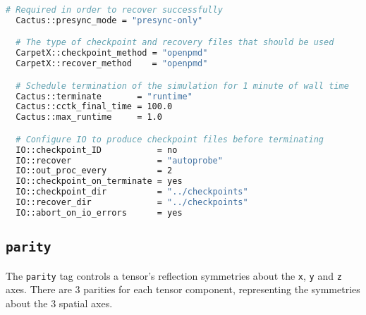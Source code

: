 \begin{lstlisting}[language=bash]
  # Required in order to recover successfully
  Cactus::presync_mode = "presync-only"

  # The type of checkpoint and recovery files that should be used
  CarpetX::checkpoint_method = "openpmd"
  CarpetX::recover_method    = "openpmd"

  # Schedule termination of the simulation for 1 minute of wall time
  Cactus::terminate       = "runtime"
  Cactus::cctk_final_time = 100.0
  Cactus::max_runtime     = 1.0

  # Configure IO to produce checkpoint files before terminating
  IO::checkpoint_ID           = no
  IO::recover                 = "autoprobe"
  IO::out_proc_every          = 2
  IO::checkpoint_on_terminate = yes
  IO::checkpoint_dir          = "../checkpoints"
  IO::recover_dir             = "../checkpoints"
  IO::abort_on_io_errors      = yes
\end{lstlisting}

\subsection{\texttt{parity}}
The \texttt{parity} tag controls a tensor's reflection symmetries about the \texttt{x}, \texttt{y} and \texttt{z} axes. There are 3 parities for each tensor component, representing the symmetries about the 3 spatial axes.

